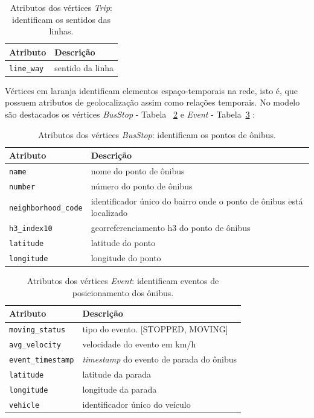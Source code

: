 \begin{table}[htb]
    \caption{Atributos dos vértices \emph{Trip}: identificam os sentidos das linhas.}
    \label{tab:vertice_trip}
    \centering
    \footnotesize
    \begin{tabular}{p{2.5cm}p{2.5cm}}
        \hline
        Atributo & Descrição\\
        \hline
        \texttt{line\_way} & sentido da linha \\
        \hline  
    \end{tabular}
\end{table}


Vértices em laranja identificam elementos espaço-temporais na rede, isto é, que possuem atributos de geolocalização assim como relações temporais. No modelo são destacados os vértices \emph{BusStop} - Tabela ~\ref{tab:vertice_busstop} e \emph{Event} - Tabela~\ref{tab:vertice_event} :

\begin{table}[!htb]
    \caption{Atributos dos vértices \emph{BusStop}:  identificam os pontos de ônibus.}
    \label{tab:vertice_busstop}
    \centering
    \footnotesize
    \begin{tabular}{p{2.5cm}p{5cm}} 
        \hline
        Atributo & Descrição\\
        \hline
        \texttt{name} & nome do ponto de ônibus  \\
        \texttt{number} & número do ponto de ônibus \\
        \texttt{neighborhood\_code} & identificador único do bairro onde o ponto de ônibus está localizado\\
        \texttt{h3\_index10} & georreferenciamento h3 do ponto de ônibus  \\
        \texttt{latitude} & latitude do ponto \\
        \texttt{longitude} & longitude do ponto \\
        \hline
    \end{tabular}
\end{table}


\begin{table}[!htb]
    \caption{Atributos dos vértices \emph{Event}: identificam eventos de posicionamento dos ônibus.}
    \label{tab:vertice_event}
    \centering
    \footnotesize
    \begin{tabular}{p{3cm}p{6cm}} 
        \hline
        Atributo & Descrição\\
        \hline
        \texttt{moving\_status} & tipo do evento. [STOPPED, MOVING] \\
        \texttt{avg\_velocity} & velocidade do evento em km/h \\
        \texttt{event\_timestamp} & \emph{timestamp} do evento de parada do ônibus  \\
        \texttt{latitude} & latitude da parada  \\
        \texttt{longitude} & longitude da parada  \\
        \texttt{vehicle} & identificador único do veículo \\
        \hline  
    \end{tabular}
\end{table}

